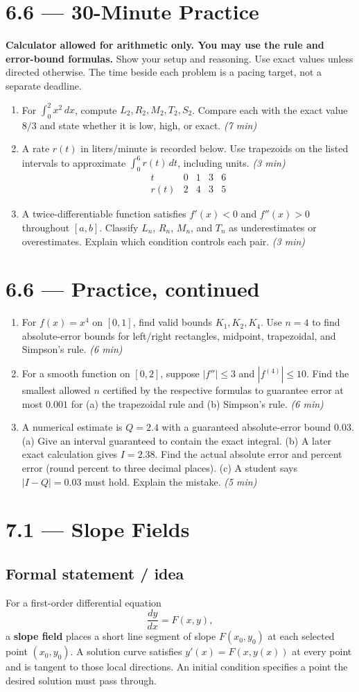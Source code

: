 \documentclass[11pt]{article}
\newcommand{\topic}[2]{\clearpage\section*{#1 --- #2}}
\newcommand{\practice}[2]{\clearpage\section*{#1 --- 30-Minute Practice}\textbf{#2} Show your setup and reasoning. Use exact values unless directed otherwise. The time beside each problem is a pacing target, not a separate deadline.}
\newcommand{\continued}[1]{\clearpage\section*{#1 --- Practice, continued}}
\newcommand{\mins}[1]{\hfill\textit{(#1 min)}}
\newcommand{\dx}{\,dx}
\begin{document}
\practice{6.6}{Calculator allowed for arithmetic only. You may use the rule and error-bound formulas.}
\begin{enumerate}
\item For $\int_0^2x^2\dx$, compute $L_2,R_2,M_2,T_2,S_2$.
Compare each with the exact value $8/3$ and state whether it is low, high, or exact. \mins{7}
\vfill
\item A rate $r(t)$ in liters/minute is recorded below. Use trapezoids on the listed intervals to approximate $\int_0^6r(t)\,dt$, including units. \mins{3}
\[
\begin{array}{c|rrrr}t&0&1&3&6\\\hline r(t)&2&4&3&5\end{array}
\]
\vfill
\item A twice-differentiable function satisfies $f'(x)<0$ and $f''(x)>0$ throughout $[a,b]$.
Classify $L_n$, $R_n$, $M_n$, and $T_n$ as underestimates or overestimates. Explain which condition controls each pair. \mins{3}
\vfill
\end{enumerate}
\continued{6.6}
\begin{enumerate}[start=4]
\item For $f(x)=x^4$ on $[0,1]$, find valid bounds $K_1,K_2,K_4$.
Use $n=4$ to find absolute-error bounds for left/right rectangles, midpoint, trapezoidal, and Simpson's rule. \mins{6}
\vfill
\item For a smooth function on $[0,2]$, suppose $|f''|\le3$ and $|f^{(4)}|\le10$.
Find the smallest allowed $n$ certified by the respective formulas to guarantee error at most $0.001$ for (a) the trapezoidal rule and (b) Simpson's rule. \mins{6}
\vfill
\item A numerical estimate is $Q=2.4$ with a guaranteed absolute-error bound $0.03$.
(a) Give an interval guaranteed to contain the exact integral.
(b) A later exact calculation gives $I=2.38$. Find the actual absolute error and percent error (round percent to three decimal places).
(c) A student says $|I-Q|=0.03$ must hold. Explain the mistake. \mins{5}
\vfill
\end{enumerate}

\topic{7.1}{Slope Fields}
\subsection*{Formal statement / idea}
For a first-order differential equation
\[
\frac{dy}{dx}=F(x,y),
\]
a \textbf{slope field} places a short line segment of slope $F(x_0,y_0)$ at each selected point $(x_0,y_0)$. A solution curve satisfies $y'(x)=F(x,y(x))$ at every point and is tangent to those local directions. An initial condition specifies a point the desired solution must pass through.
\end{document}
